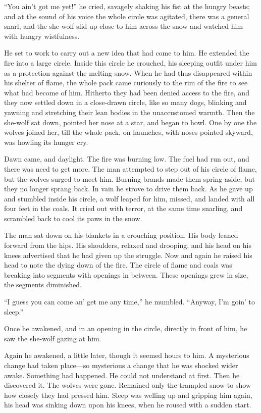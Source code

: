 \documentclass[10pt]{book}
\begin{document}
“You ain’t got me yet!” he cried, savagely shaking his fist at the
hungry beasts; and at the sound of his voice the whole circle was
agitated, there was a general snarl, and the she-wolf slid up close to
him across the snow and watched him with hungry wistfulness.

He set to work to carry out a new idea that had come to him. He
extended the fire into a large circle. Inside this circle he crouched,
his sleeping outfit under him as a protection against the melting snow.
When he had thus disappeared within his shelter of flame, the whole
pack came curiously to the rim of the fire to see what had become of
him. Hitherto they had been denied access to the fire, and they now
settled down in a close-drawn circle, like so many dogs, blinking and
yawning and stretching their lean bodies in the unaccustomed warmth.
Then the she-wolf sat down, pointed her nose at a star, and began to
howl. One by one the wolves joined her, till the whole pack, on
haunches, with noses pointed skyward, was howling its hunger cry.

Dawn came, and daylight. The fire was burning low. The fuel had run
out, and there was need to get more. The man attempted to step out of
his circle of flame, but the wolves surged to meet him. Burning brands
made them spring aside, but they no longer sprang back. In vain he
strove to drive them back. As he gave up and stumbled inside his
circle, a wolf leaped for him, missed, and landed with all four feet in
the coals. It cried out with terror, at the same time snarling, and
scrambled back to cool its paws in the snow.

The man sat down on his blankets in a crouching position. His body
leaned forward from the hips. His shoulders, relaxed and drooping, and
his head on his knees advertised that he had given up the struggle. Now
and again he raised his head to note the dying down of the fire. The
circle of flame and coals was breaking into segments with openings in
between. These openings grew in size, the segments diminished.

“I guess you can come an’ get me any time,” he mumbled. “Anyway, I’m
goin’ to sleep.”

Once he awakened, and in an opening in the circle, directly in front of
him, he saw the she-wolf gazing at him.

Again he awakened, a little later, though it seemed hours to him. A
mysterious change had taken place—so mysterious a change that he was
shocked wider awake. Something had happened. He could not understand at
first. Then he discovered it. The wolves were gone. Remained only the
trampled snow to show how closely they had pressed him. Sleep was
welling up and gripping him again, his head was sinking down upon his
knees, when he roused with a sudden start.
\end{document}
